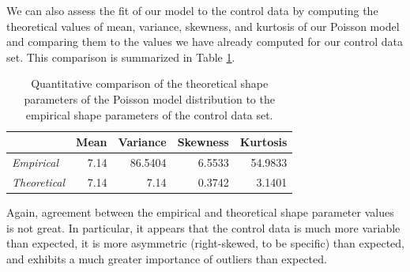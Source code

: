 \documentclass{amsart}
\begin{document}
We can also assess the fit of our model to the control data by computing the theoretical values of mean, variance, skewness, and kurtosis of our Poisson model and comparing them to the values we have already computed for our control data set. This comparison is summarized in Table \ref{Tbl:quantitativeAssessment}.
\begin{table}
\begin{tabular}{lrrrr}
\toprule
			&	{\bf Mean}	&	{\bf Variance}	&	{\bf Skewness}	&	{\bf Kurtosis}\\\midrule
{\sl Empirical}	&	7.14	&	86.5404	&	6.5533		&	54.9833\\ 
{\sl Theoretical}&	7.14	&	7.14		&	0.3742		&	3.1401\\
\bottomrule
\end{tabular}
 \caption{Quantitative comparison of the theoretical shape parameters of the Poisson model distribution to the empirical shape parameters of the control data set.\label{Tbl:quantitativeAssessment}}
\end{table}
Again, agreement between the empirical and theoretical shape parameter values is not great. In particular, it appears that the control data is much more variable than expected, it is more asymmetric (right-skewed, to be specific) than expected, and exhibits a much greater importance of outliers than expected.
\end{document}
